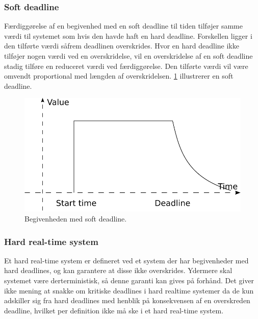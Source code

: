 \subsubsection{Soft deadline}
Færdiggørelse af en begivenhed med en soft deadline til tiden tilføjer samme værdi til systemet som hvis den havde haft en hard deadline. Forskellen ligger i den tilførte værdi såfrem deadlinen overskrides. Hvor en hard deadline ikke tilføjer nogen værdi ved en overskridelse, vil en overskridelse af en soft deadline stadig tilføre en reduceret værdi ved færdiggørelse. Den tilførte værdi vil være omvendt proportional med længden af overskridelsen. \cref{figure:soft-dl} illustrerer en soft deadline. 

\begin{figure}
 \begin{center}
  \includegraphics[scale=0.75]{images/soft-deadline}
	\caption{Begivenheden med soft deadline.}
	\label{figure:soft-dl}
\end{center}
\end{figure}



\subsubsection{Hard real-time system}
Et hard real-time system er defineret ved et system der har begivenheder med hard deadlines, og kan garantere at disse ikke overskrides. Ydermere skal systemet være derterministisk, så denne garanti kan gives på forhånd. Det giver ikke mening at snakke om kritiske deadlines i hard realtime systemer da de kun adskiller sig fra hard deadlines med henblik på konsekvensen af en overskreden deadline, hvilket per definition ikke må ske i et hard real-time system.  

